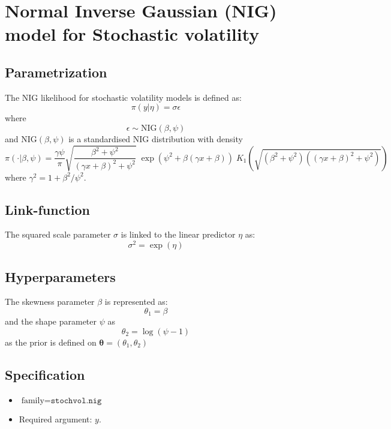 \documentclass[a4paper,11pt]{article}
\begin{document}
\section*{ Normal Inverse Gaussian (NIG) model for Stochastic
    volatility}

\subsection*{Parametrization}

The NIG likelihood for stochastic volatility models is defined as:
\[
\pi(y |\eta )=\sigma \epsilon
\]
where
\[
\epsilon \sim\mbox{NIG}(\beta,\psi)
\]
and $\mbox{NIG}(\beta,\psi)$ is a standardised NIG distribution with
density
\begin{displaymath}
    \pi(\cdot|\beta,\psi)=\frac{\gamma\psi}{\pi} \sqrt{ \frac{\beta^{2} +
            \psi^{2}}{(\gamma x + \beta)^{2} + \psi^{2}}}
    \;
    \exp\left(\psi^{2} + \beta(\gamma x + \beta)\right)
    \;
    K_{1}\left(\sqrt{ \left(\beta^{2}+\psi^{2}\right)\left((\gamma x
            + \beta)^{2}+\psi^{2}\right)}\right)
\end{displaymath}
where $\gamma^{2} = 1 + \beta^{2}/\psi^{2}$.


\subsection*{Link-function}

The squared scale parameter $\sigma$ is linked to the linear predictor $\eta
$ as:
\[
\sigma^{2} =\exp(\eta)
\]


\subsection*{Hyperparameters}

The skewness parameter $\beta$ is represented as:
\[
\theta_1 = \beta
\]
and the shape parameter $\psi$ as
\[
\theta_2 = \log(\psi-1)
\]
as the prior is defined on $\mathbf{\theta}=(\theta_1,\theta_2)$

\subsection*{Specification}

\begin{itemize}
\item $\text{family}=\texttt{stochvol.nig}$
\item Required argument: $y$.
\end{itemize}
\end{document}
